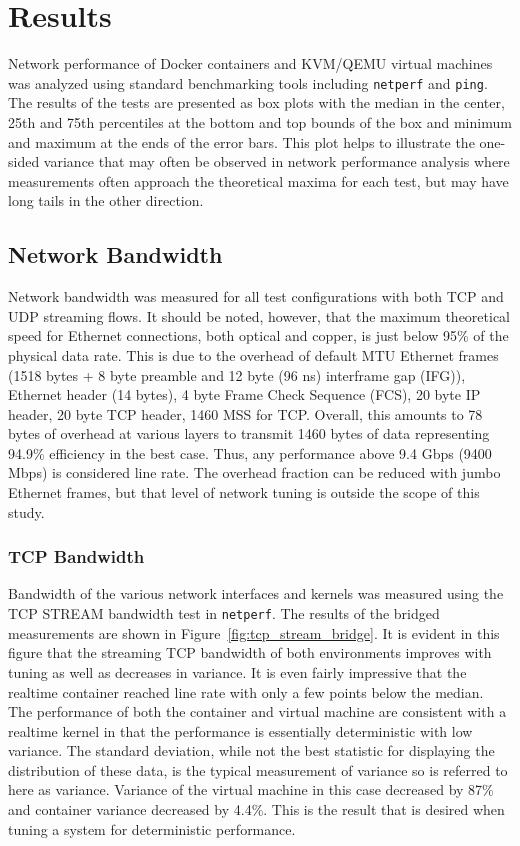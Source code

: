 \chapter{Results}
\label{sec:results}
Network performance of Docker containers and KVM/QEMU virtual machines was analyzed using standard benchmarking tools including \texttt{netperf} and \texttt{ping}.  
The results of the tests are presented as box plots with the median in the center, 25th and 75th percentiles at the bottom and top bounds of the box and minimum and maximum at the ends of the error bars.
This plot helps to illustrate the one-sided variance that may often be observed in network performance analysis where measurements often approach the theoretical maxima for each test, but may have long tails in the other direction.  

\section{Network Bandwidth} %
\label{sec:networkbandwidth}
Network bandwidth was measured for all test configurations with both TCP and UDP streaming flows.
It should be noted, however, that the maximum theoretical speed for Ethernet connections, both optical and copper, is just below 95\% of the physical data rate.
This is due to the overhead of default MTU Ethernet frames (1518 bytes + 8 byte preamble and 12 byte (96 ns) interframe gap (IFG)), Ethernet header (14 bytes), 4 byte Frame Check Sequence (FCS), 20 byte IP header, 20 byte TCP header, 1460 MSS for TCP.
Overall, this amounts to 78 bytes of overhead at various layers to transmit 1460 bytes of data representing 94.9\% efficiency in the best case.  
Thus, any performance above 9.4 Gbps (9400 Mbps) is considered line rate.  
The overhead fraction can be reduced with jumbo Ethernet frames, but that level of network tuning is outside the scope of this study.

\subsection{TCP Bandwidth} %
\label{sub:tcpbandwidth}
Bandwidth of the various network interfaces and kernels was measured using the TCP STREAM bandwidth test in \texttt{netperf}.
The results of the bridged measurements are shown in Figure~\ref{fig:tcp_stream_bridge}. 
It is evident in this figure that the streaming TCP bandwidth of both environments improves with tuning as well as decreases in variance.  
It is even fairly impressive that the realtime container reached line rate with only a few points below the median.  
The performance of both the container and virtual machine are consistent with a realtime kernel in that the performance is essentially deterministic with low variance.
The standard deviation, while not the best statistic for displaying the distribution of these data, is the typical measurement of variance so is referred to here as variance.
Variance of the virtual machine in this case decreased by 87\% and container variance decreased by 4.4\%.  
This is the result that is desired when tuning a system for deterministic performance.

